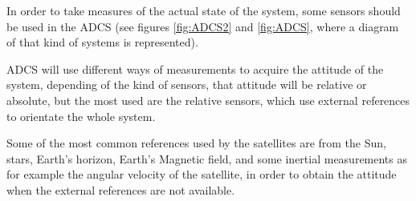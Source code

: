 In order to take measures of the actual state of the system, some sensors should be used in the \acrshort{ADCS} (see figures \ref{fig:ADCS2} and \ref{fig:ADCS}, where a diagram of that kind of systems is represented). 

\acrshort{ADCS} will use different ways of measurements to acquire the attitude of the system, depending of the kind of sensors, that attitude will be relative or absolute, but the most used are the relative sensors, which use external references to orientate the whole system.

Some of the most common references used by the satellites are from the Sun, stars, Earth's horizon, Earth's Magnetic field, and some inertial measurements as for example the angular velocity of the satellite, in order to obtain the attitude when the external references are not available.

